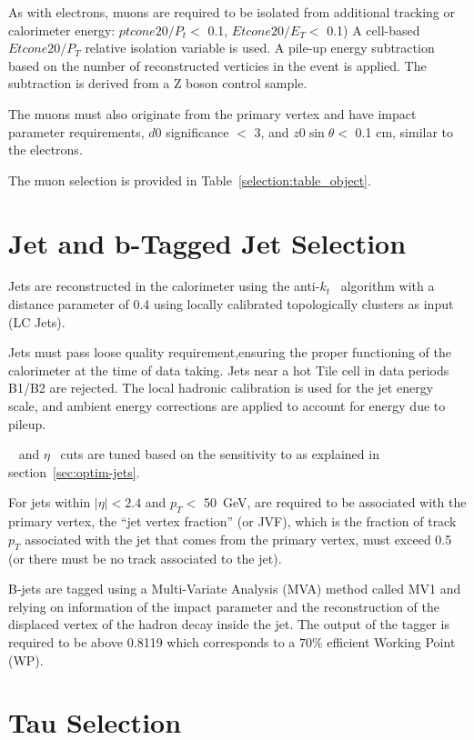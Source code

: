 As with electrons, muons are required to be isolated from 
additional tracking or calorimeter energy: $ptcone20/P_t <$ 0.1, $Etcone20/E_T <$ 0.1) A cell-based $Etcone20/P_T$ relative
isolation variable is used. A pile-up energy subtraction based 
on the number of reconstructed verticies in the event is applied. The
subtraction is derived from a Z boson control sample.


The muons must also originate from the primary vertex and have impact parameter requirements, $d0$ significance $<$ 3, and $z0\sin{\theta} <$ 0.1 cm, similar to the electrons. 


The muon selection is provided in Table~\ref{selection:table_object}. 

\section{Jet and b-Tagged Jet Selection}

Jets are reconstructed in the calorimeter using the anti-$k_t$~\cite{Cacciari:2008gp} algorithm
with a distance parameter of 0.4 using locally calibrated
topologically clusters as input (LC Jets). 

Jets must pass loose quality requirement,ensuring the proper
functioning of the calorimeter at the time of data taking. Jets near a hot Tile cell in data periods
B1/B2 are rejected. The local hadronic calibration is used for
the jet energy scale, and ambient energy corrections are applied to account
for energy due to pileup.

\pt~ and $\eta$~ cuts are tuned based on the sensitivity to \tth
as explained in section~\ref{sec:optim-jets}. 

For jets within $|\eta| < 2.4$ and $p_T <$ 50~GeV, are required to be
associated with the primary vertex, the ``jet vertex fraction'' (or JVF),
which is the fraction of track $p_T$ associated with the jet that comes from the primary vertex,
must exceed 0.5 (or there must be no track associated to the jet). 

B-jets are tagged using a Multi-Variate Analysis (MVA) method called MV1 and relying on information
of the impact parameter and the reconstruction of the displaced vertex of the
hadron decay inside the jet.%
The output of the tagger is required to be above 0.8119 which corresponds to a $70\%$ efficient Working Point (WP).

\section{Tau Selection} 


